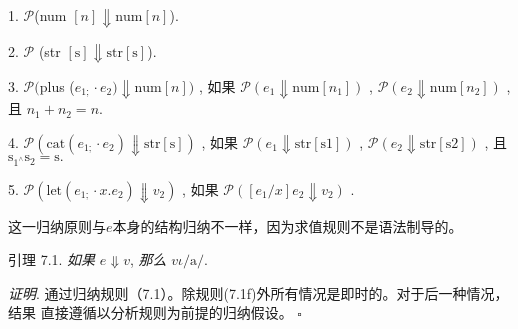 1. $\mathcal{P}$(num $[n]\Downarrow \mathrm{n}\mathrm{u}\mathrm{m}[n]$).

2. $\mathcal{P}$ (str $[\mathrm{s}]\Downarrow \mathrm{s}\mathrm{t}\mathrm{r}[\mathrm{s}]$).

3. $\mathcal{P}($plus ($e_{1;}\cdot e_{2})\Downarrow \mathrm{n}\mathrm{u}\mathrm{m}[n])$ , 如果 $\mathcal{P}(e_{1}\Downarrow \mathrm{n}\mathrm{u}\mathrm{m}[n_{1}])$ , $\mathcal{P}(e_{2}\Downarrow \mathrm{n}\mathrm{u}\mathrm{m}[n_{2}])$ , 且 $n_{1}+n_{2}=n.$

4. $\mathcal{P}(\mathrm{c}\mathrm{a}\mathrm{t}(e_{1;}\cdot e_{2})\Downarrow \mathrm{s}\mathrm{t}\mathrm{r}[\mathrm{s}])$ , 如果 $\mathcal{P}(e_{1}\Downarrow \mathrm{s}\mathrm{t}\mathrm{r}[\mathrm{s}1])$ , $\mathcal{P}(e_{2}\Downarrow \mathrm{s}\mathrm{t}\mathrm{r}[\mathrm{s}2])$ , 且 $\mathrm{s}_{1^{\wedge}}\mathrm{s}_{2}=\mathrm{s}.$

5. $\mathcal{P}(\mathrm{l}\mathrm{e}\mathrm{t}(e_{1;}\cdot x.e_{2})\Downarrow v_{2})$ , 如果 $\mathcal{P}([e_{1}/x]e_{2}\Downarrow v_{2})$ .

这一归纳原则与$e$本身的结构归纳不一样，因为求值规则不是语法制导的。

引理 7.1. {\it 如果} $e\Downarrow v$, {\it 那么} $v\iota/\mathrm{a}/.$%

{\it 证明}. 通过归纳规则（7.1）。除规则(7.1f)外所有情况是即时的。对于后一种情况，结果
直接遵循以分析规则为前提的归纳假设。 $\square $

